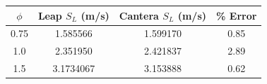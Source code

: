 {
\centering
\begin{tabular}{cccc}\hline
$\phi$ & Leap $S_{L}$ (m/s) & Cantera $S_{L}$ (m/s) & \% Error \\ \hline
0.75 & 1.585566 & 1.599170 & 0.85 \\
1.0 & 2.351950 & 2.421837 & 2.89 \\
1.5 & 3.1734067 & 3.153888 & 0.62 \\ \hline
\end{tabular}
}

